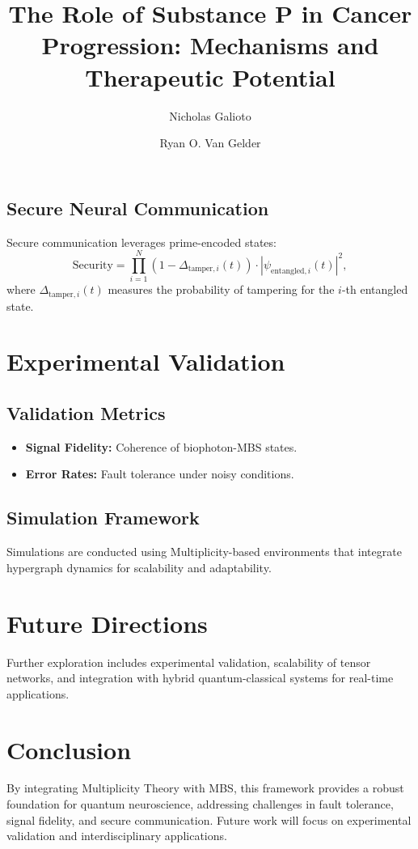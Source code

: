 \documentclass{article}
\theoremstyle{plain}
\theoremstyle{definition}
\begin{document}
\subsection{Secure Neural Communication}
Secure communication leverages prime-encoded states:
\begin{equation}
\text{Security} = \prod_{i=1}^N \left( 1 - \Delta_{\text{tamper},i}(t) \right) \cdot \left| \psi_{\text{entangled},i}(t) \right|^2,
\end{equation}
where $\Delta_{\text{tamper},i}(t)$ measures the probability of tampering for the $i$-th entangled state.

\section{Experimental Validation}

\subsection{Validation Metrics}
\begin{itemize}
    \item \textbf{Signal Fidelity:} Coherence of biophoton-MBS states.
    \item \textbf{Error Rates:} Fault tolerance under noisy conditions.
\end{itemize}

\subsection{Simulation Framework}
Simulations are conducted using Multiplicity-based environments that integrate hypergraph dynamics for scalability and adaptability.

\section{Future Directions}
Further exploration includes experimental validation, scalability of tensor networks, and integration with hybrid quantum-classical systems for real-time applications.

\section{Conclusion}
By integrating Multiplicity Theory with MBS, this framework provides a robust foundation for quantum neuroscience, addressing challenges in fault tolerance, signal fidelity, and secure communication. Future work will focus on experimental validation and interdisciplinary applications.
\title{The Role of Substance P in Cancer Progression: Mechanisms and Therapeutic Potential}
\author{Nicholas Galioto}
\author{Ryan O. Van Gelder}
\date{}
\end{document}
